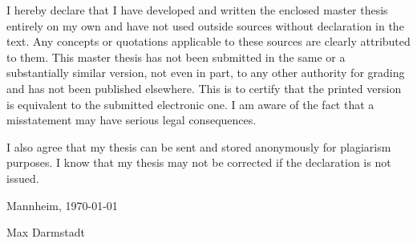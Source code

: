 \newpage

{I hereby declare that I have developed and written the enclosed master thesis entirely on my own and have not used outside sources without declaration in the text. Any concepts or quotations applicable to these sources are clearly attributed to them. This master thesis has not been submitted in the same or a substantially similar version, not even in part, to any other authority for grading and has not been published elsewhere. This is to certify that the printed version is equivalent to the submitted electronic one. I am aware of the fact that a misstatement may have serious legal consequences.\par}

\vspace{0.7cm}
{I also agree that my thesis can be sent and stored anonymously for plagiarism purposes. I know that my thesis may not be corrected if the declaration is not issued.\par}
\vspace{0.7cm}


Mannheim, \today

\vspace{1.4cm}
Max Darmstadt